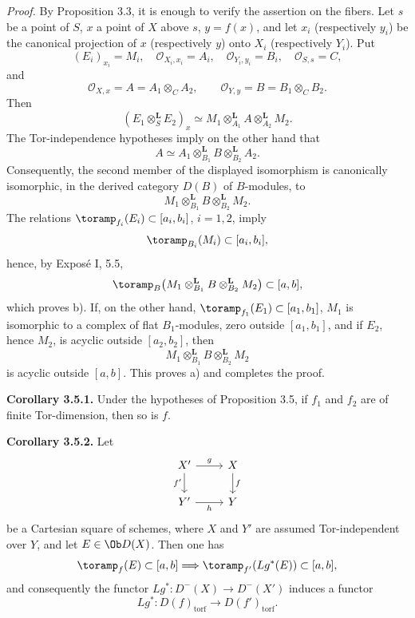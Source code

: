 \emph{Proof.} By Proposition 3.3, it is enough to verify the assertion on the fibers. Let \(s\) be a point of \(S\), \(x\) a point of \(X\) above \(s\), \(y=f(x)\), and let \(x_i\) (respectively \(y_i\)) be the canonical projection of \(x\) (respectively \(y\)) onto \(X_i\) (respectively \(Y_i\)). Put
\[
  (E_i)_{x_i}=M_i,\quad
  \mathcal O_{X_i,x_i}=A_i,\quad
  \mathcal O_{Y_i,y_i}=B_i,\quad
  \mathcal O_{S,s}=C,
\]
and
\[
  \mathcal O_{X,x}=A=A_1\otimes_C A_2,\qquad
  \mathcal O_{Y,y}=B=B_1\otimes_C B_2.
\]
Then
\[
  (E_1\otimes_S^{\mathbf L}E_2)_x
  \simeq
  M_1\otimes_{A_1}^{\mathbf L} A
  \otimes_{A_2}^{\mathbf L} M_2.
\]
The Tor-independence hypotheses imply on the other hand that
\[
  A\simeq A_1\otimes_{B_1}^{\mathbf L}B
       \otimes_{B_2}^{\mathbf L}A_2.
\]
Consequently, the second member of the displayed isomorphism is canonically isomorphic, in the derived category \(D(B)\) of \(B\)-modules, to
\[
  M_1\otimes_{B_1}^{\mathbf L}B
       \otimes_{B_2}^{\mathbf L}M_2.
\]
The relations \(\toramp_{f_i}(E_i)\subset[a_i,b_i]\), \(i=1,2\), imply
\[
  \toramp_{B_i}(M_i)\subset[a_i,b_i],
\]
hence, by Exposé I, 5.5,
\[
  \toramp_B\bigl(M_1\otimes_{B_1}^{\mathbf L}B
  \otimes_{B_2}^{\mathbf L}M_2\bigr)\subset[a,b],
\]
which proves b). If, on the other hand, \(\toramp_{f_1}(E_1)\subset[a_1,b_1]\), \(M_1\) is isomorphic to a complex of flat \(B_1\)-modules, zero outside \([a_1,b_1]\), and if \(E_2\), hence \(M_2\), is acyclic outside \([a_2,b_2]\), then
\[
  M_1\otimes_{B_1}^{\mathbf L}B\otimes_{B_2}^{\mathbf L}M_2
\]
is acyclic outside \([a,b]\). This proves a) and completes the proof.

\textbf{Corollary 3.5.1.} Under the hypotheses of Proposition 3.5, if \(f_1\) and \(f_2\) are of finite Tor-dimension, then so is \(f\).

\textbf{Corollary 3.5.2.} Let
\[
\begin{tikzcd}
X' \arrow[r,"g"] \arrow[d,"f'"'] & X \arrow[d,"f"]\\
Y' \arrow[r,"h"'] & Y
\end{tikzcd}
\]
be a Cartesian square of schemes, where \(X\) and \(Y'\) are assumed Tor-independent over \(Y\), and let \(E\in \Ob D(X)\). Then one has
\[
  \toramp_f(E)\subset[a,b]\Longrightarrow
  \toramp_{f'}(Lg^*(E))\subset[a,b],
\]
and consequently the functor \(Lg^*:D^{-}(X)\to D^{-}(X')\) induces a functor
\[
  Lg^*:D(f)_{\mathrm{torf}}\longrightarrow D(f')_{\mathrm{torf}} .
\]



